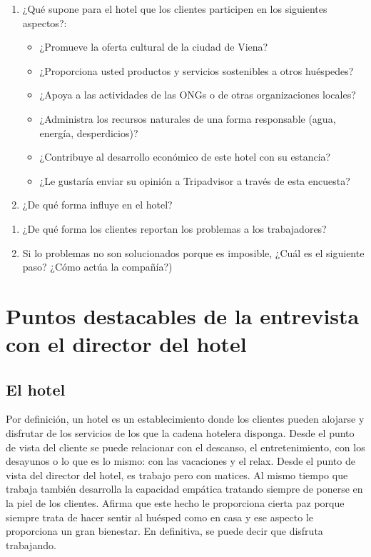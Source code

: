 \begin{enumerate}
	\item ¿Qué supone para el hotel que los clientes participen en los siguientes aspectos?:

	\begin{itemize}
			\item ¿Promueve la oferta cultural de la ciudad de Viena?
			\item ¿Proporciona usted productos y servicios sostenibles a otros huéspedes?
			\item ¿Apoya a las actividades de las ONGs o de otras organizaciones locales?
			\item ¿Administra los recursos naturales de una forma responsable (agua, energía, desperdicios)?
			\item ¿Contribuye al desarrollo económico de este hotel con su estancia?
			\item ¿Le gustaría enviar su opinión a Tripadvisor a través de esta encuesta?

	\end{itemize}

	\item ¿De qué forma influye en el hotel?

\end{enumerate}

\begin{enumerate}
	\item ¿De qué forma los clientes reportan los problemas a los trabajadores?
	\item Si lo problemas no son solucionados porque es imposible, ¿Cuál es el siguiente paso? ¿Cómo actúa la compañía?)

\end{enumerate}

\chapter{Puntos destacables de la entrevista con el director del hotel}
\label{anexo:13}

\section*{El hotel}
Por definición, un hotel es un establecimiento donde los clientes pueden alojarse y disfrutar de los servicios de los que la cadena hotelera disponga. Desde el punto de vista del cliente se puede relacionar con el descanso, el entretenimiento, con los desayunos o lo que es lo mismo: con las vacaciones y el relax. Desde el punto de vista del director del hotel, es trabajo pero con matices. Al mismo tiempo que trabaja también desarrolla la capacidad empática tratando siempre de ponerse en la piel de los clientes. Afirma que este hecho le proporciona cierta paz porque siempre trata de hacer sentir al huésped como en casa y ese aspecto le proporciona un gran bienestar. En definitiva, se puede decir que disfruta trabajando.

